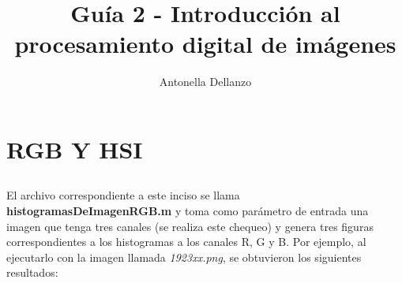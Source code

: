 \documentclass{article}
\begin{document}
\author{Antonella Dellanzo}
\title{Guía 2 - Introducción al procesamiento digital de imágenes}
\date{}
\maketitle

\section{RGB Y HSI}


\subsection{}
El archivo correspondiente a este inciso se llama \textbf{histogramasDeImagenRGB.m} y toma como parámetro de entrada una imagen que tenga tres canales (se realiza este chequeo) y genera tres figuras correspondientes a los histogramas a los canales R, G y B. Por ejemplo, al ejecutarlo con la imagen llamada \textit{1923xx.png}, se obtuvieron los siguientes resultados:
\end{document}
